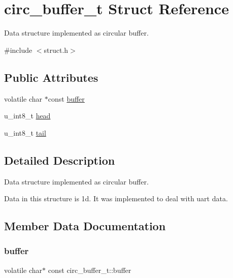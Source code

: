 \hypertarget{structcirc__buffer__t}{}\section{circ\+\_\+buffer\+\_\+t Struct Reference}
\label{structcirc__buffer__t}


Data structure implemented as circular buffer.  




{\ttfamily \#include $<$struct.\+h$>$}

\subsection*{Public Attributes}
\begin{DoxyCompactItemize}
\item 
volatile char $\ast$const \hyperlink{structcirc__buffer__t_aa817597980b60e12f1fff8a95496564c}{buffer}
\item 
u\+\_\+int8\+\_\+t \hyperlink{structcirc__buffer__t_aef8f62f80f1f898826f8289c3c8ee3e1}{head}
\item 
u\+\_\+int8\+\_\+t \hyperlink{structcirc__buffer__t_ac263e578598ba3ca3c25af3977450e27}{tail}
\end{DoxyCompactItemize}


\subsection{Detailed Description}
Data structure implemented as circular buffer. 

Data in this structure is 1d. It was implemented to deal with uart data. 

\subsection{Member Data Documentation}
\mbox{\label{structcirc__buffer__t_aa817597980b60e12f1fff8a95496564c}} 
\subsubsection{\texorpdfstring{buffer}{buffer}}
{\footnotesize\ttfamily volatile char$\ast$ const circ\+\_\+buffer\+\_\+t\+::buffer}

